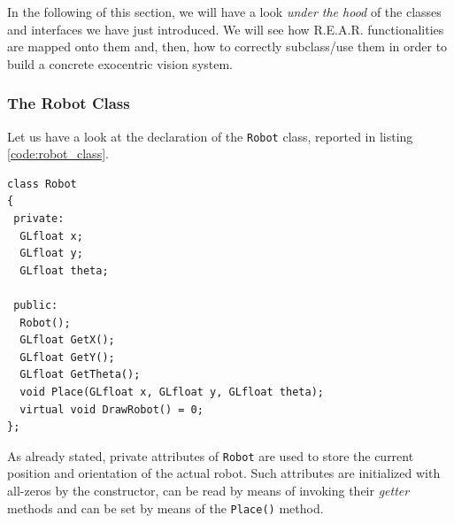 %
In the following of this section, we will have a look 
\textit{under the hood} of the classes and interfaces 
we have just introduced.
%
We will see how \textsf{R.E.A.R.} functionalities are 
mapped onto them and, then, how to correctly subclass/use
them in order to build a concrete exocentric vision system.
%

%
\subsubsection{The Robot Class}
\label{sub:robotclass}
Let us have a look at the declaration of the \texttt{Robot}
class, reported in listing \ref{code:robot_class}.
%
\begin{lstlisting}[caption={\texttt{Robot} class declaration}, label={code:robot_class}, frame=trBL]
class Robot
{
 private:
  GLfloat x;
  GLfloat y;					
  GLfloat theta;

 public:
  Robot();
  GLfloat GetX();
  GLfloat GetY();
  GLfloat GetTheta();
  void Place(GLfloat x, GLfloat y, GLfloat theta);
  virtual void DrawRobot() = 0;
};
\end{lstlisting}
%
As already stated, private attributes of \texttt{Robot} 
are used to store the current position and orientation 
of the actual robot. Such attributes are initialized with 
all-zeros by the constructor, can be read by means 
of invoking their \textit{getter} methods and can be set 
by means of the \texttt{Place()} method.
%

